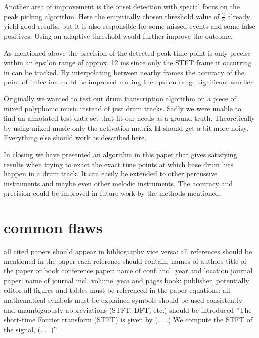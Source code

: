 \documentclass{article}
\begin{document}
Another area of improvement is the onset detection with special focus on the peak picking algorithm.
Here the empirically chosen threshold value of $\frac{2}{3}$ already yield good results, but it is also responsible for some missed events and some false positives.
Using an adaptive threshold would further improve the outcome.

As mentioned above the precision of the detected peak time point is only precise within an epsilon range of approx. 12 ms since only the STFT frame it occurring in can be tracked.
By interpolating between nearby frames the accuracy of the point of inflection could be improved making the epsilon range significant smaller.

Originally we wanted to test our drum transcription algorithm on a piece of mixed polyphonic music instead of just drum tracks.
Sadly we were unable to find an annotated test data set that fit our needs as a ground truth.
Theoretically by using mixed music only the activation matrix $\mathbf{H}$ should get a bit more noisy.
Everything else should work as described here.

In closing we have presented an algorithm in this paper that gives satisfying results when trying to exact the exact time points at which base drum hits happen in a drum track.
It can easily be extended to other percussive instruments and maybe even other melodic instruments.
The accuracy and precision could be improved in future work by the methods mentioned.









\vfill\pagebreak

\section{common flaws}
all cited papers should appear in bibliography
vice versa: all references should be mentioned in the paper
each reference should contain:
names of authors
title of the paper or book
conference paper: name of conf. incl. year and location
journal paper: name of journal incl. volume, year and pages
book: publisher, potentially editor
all figures and tables must be referenced in the paper
equations:
all mathematical symbols must be explained
symbols should be used consistently and unambiguously
abbreviations (STFT, DFT, etc.) should be introduced
”The short-time Fourier transform (STFT) is given by (. . .)
We compute the STFT of the signal, (. . .)”
\end{document}
